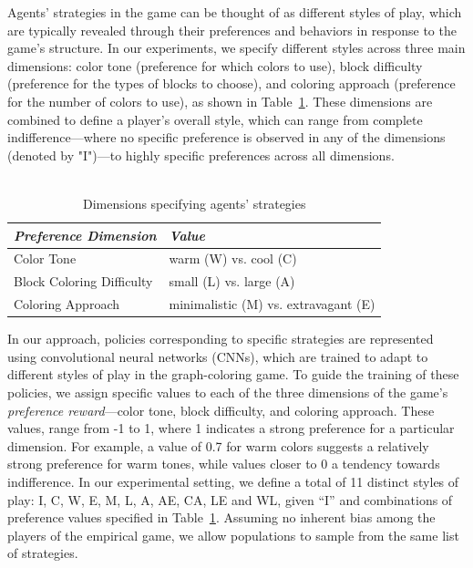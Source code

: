 \begin{flushleft}
\begin{flushleft}
        Agents' strategies in the game can be thought of as different styles of play, which are typically revealed through their preferences and behaviors in response to the game’s structure. In our experiments, we specify different styles across three main dimensions: color tone (preference for which colors to use), block difficulty (preference for the types of blocks to choose), and coloring approach (preference for the number of colors to use), as shown in Table~\ref{tab:preferences}. These dimensions are combined to define a player's overall style, which can range from complete indifference—where no specific preference is observed in any of the dimensions (denoted by "I")—to highly specific preferences across all dimensions.\\~\\
        \begin{table}[H]
            \centering
            \begin{tabular}{ll}
                \toprule
                \textit{Preference Dimension} & \textit{Value} \\ 
                \midrule
                Color Tone & warm (W) vs. cool (C) \\ 
                Block Coloring Difficulty & small (L) vs. large (A) \\ 
                Coloring Approach & minimalistic (M) vs. extravagant (E) \\ 
                \bottomrule
            \end{tabular}
            \vspace{0.5em}
            \caption{Dimensions specifying agents' strategies}
            \label{tab:preferences}
        \end{table}
       
        In our approach, policies corresponding to specific strategies are represented using convolutional neural networks (CNNs), which are trained to adapt to different styles of play in the graph-coloring game. To guide the training of these policies, we assign specific values to each of the three dimensions of the game's \emph{preference reward}—color tone, block difficulty, and coloring approach. These values, range from -1 to 1, where 1 indicates a strong preference for a particular dimension. For example, a value of 0.7 for warm colors suggests a relatively strong preference for warm tones, while values closer to 0 a tendency towards indifference. In our experimental setting, we define a total of 11 distinct styles of play: I, C, W, E, M, L, A, AE, CA, LE and WL, given ``I'' and combinations of preference values specified in Table~\ref{tab:preferences}. Assuming no inherent bias among the players of the empirical game, we allow populations to sample from the same list of strategies.


\end{flushleft}
\end{flushleft}
